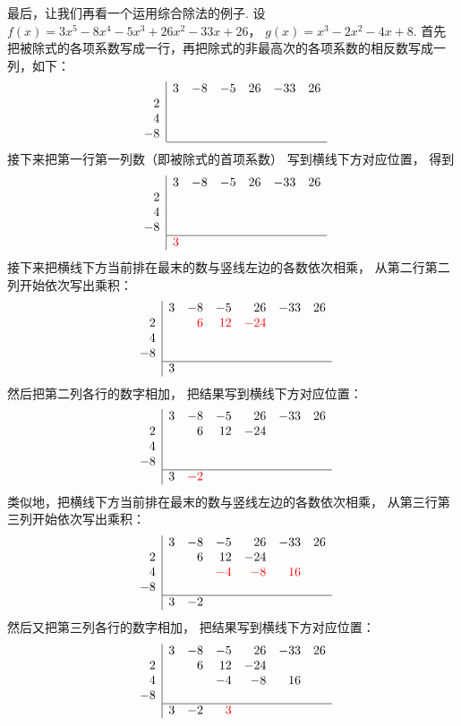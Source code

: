 最后，让我们再看一个运用综合除法的例子.
设\(f(x) = 3x^5 - 8x^4 - 5x^3 + 26x^2 - 33x + 26\)，
\(g(x) = x^3 - 2x^2 - 4x + 8\).
首先把被除式的各项系数写成一行，再把除式的非最高次的各项系数的相反数写成一列，如下：\[
	\begin{array}{r|*6r}
		& 3 & -8 & -5 & 26 & -33 & 26 \\
		2 \\
		4 \\
		-8 \\ \cline{2-7}
	\end{array}
\]
接下来把第一行第一列数（即被除式的首项系数）
写到横线下方对应位置，
得到\[
	\begin{array}{r|*6r}
		& 3 & -8 & -5 & 26 & -33 & 26 \\
		2 \\
		4 \\
		-8 \\ \cline{2-7}
		& \color{red}3
	\end{array}
\]
接下来把横线下方当前排在最末的数与竖线左边的各数依次相乘，
从第二行第二列开始依次写出乘积：\[
	\begin{array}{r|*6r}
		& 3 & -8 & -5 & 26 & -33 & 26 \\
		2 & & \color{red}6 & \color{red}12 & \color{red}-24 \\
		4 \\
		-8 \\ \cline{2-7}
		& 3
	\end{array}
\]
然后把第二列各行的数字相加，
把结果写到横线下方对应位置：\[
	\begin{array}{r|*6r}
		& 3 & -8 & -5 & 26 & -33 & 26 \\
		2 & & 6 & 12 & -24 \\
		4 \\
		-8 \\ \cline{2-7}
		& 3 & \color{red}-2
	\end{array}
\]
类似地，把横线下方当前排在最末的数与竖线左边的各数依次相乘，
从第三行第三列开始依次写出乘积：\[
	\begin{array}{r|*6r}
		& 3 & -8 & -5 & 26 & -33 & 26 \\
		2 && 6 & 12 & -24 \\
		4 &&& \color{red}-4 & \color{red}-8 & \color{red}16 \\
		-8 \\ \cline{2-7}
		& 3 & -2
	\end{array}
\]
然后又把第三列各行的数字相加，
把结果写到横线下方对应位置：\[
	\begin{array}{r|*6r}
		& 3 & -8 & -5 & 26 & -33 & 26 \\
		2 && 6 & 12 & -24 \\
		4 &&& -4 & -8 & 16 \\
		-8 \\ \cline{2-7}
		& 3 & -2 & \color{red}3
	\end{array}
\]
